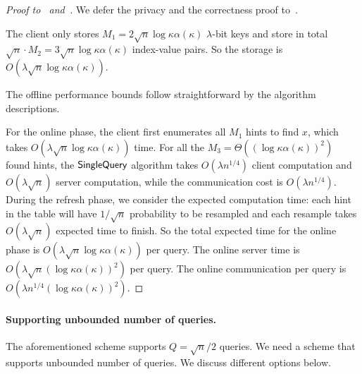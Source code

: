 \begin{proof}[Proof to~ and~]
    
    We defer the privacy and the correctness proof to~.

    The client only stores $M_1=2\sqrt{n}\log \kappa\alpha(\kappa)$
    $\lambda$-bit keys and store in total $\sqrt{n}\cdot M_2=3\sqrt{n}\log
    \kappa\alpha(\kappa)$ index-value pairs. So the storage is
    $O(\lambda\sqrt{n}\log \kappa \alpha(\kappa))$.
    
    The offline performance bounds follow straightforward by the algorithm descriptions.
    
    For the online phase, the client first enumerates all $M_1$ hints to find
    $x$, which takes $O(\lambda\sqrt{n}\log \kappa\alpha(\kappa))$ time. For all
    the $M_3=\Theta((\log \kappa \alpha(\kappa))^2)$ found hints, the
    $\mathsf{SingleQuery}$ algorithm takes $O(\lambda n^{1/4})$ client computation and
    $O(\lambda \sqrt{n})$ server computation, while the communication cost is $O(\lambda
    n^{1/4})$. During the refresh phase, we consider the expected computation time: each hint in the table will have $1/\sqrt{n}$ probability to be resampled and each resample takes $O(\lambda\sqrt{n})$ expected time to finish. 
    So the total expected time for the online phase is $O(\lambda\sqrt{n}\log \kappa
    \alpha(\kappa))$  per query. The online server time is
    $O(\lambda\sqrt{n}(\log \kappa \alpha(\kappa))^2)$ per query. The online
    communication per query is $O(\lambda n^{1/4}(\log \kappa
    \alpha(\kappa))^2)$.
\end{proof}



\paragraph{Supporting unbounded number of queries.}
The aforementioned scheme supports $Q=\sqrt{n}/2$ queries. 
We need a scheme that supports unbounded number of queries. 
We discuss different options below.


